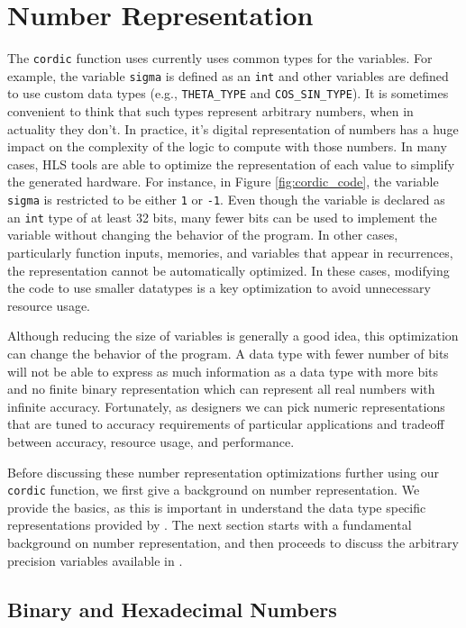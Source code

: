 \section{Number Representation}
\label{sec:number_representation}

The \lstinline{cordic} function uses currently uses common types for the variables. For example, the variable \lstinline{sigma} is defined as an \lstinline{int} and other variables are defined to use custom data types (e.g., \lstinline{THETA_TYPE} and \lstinline{COS_SIN_TYPE}).  It is sometimes convenient to think that such types represent arbitrary numbers, when in actuality they don't.  In practice, it's digital representation of numbers has a huge impact on the complexity of the logic to compute with those numbers.   In many cases, HLS tools are able to optimize the representation of each value to simplify the generated hardware.  For instance, in Figure \ref{fig:cordic_code}, the variable \lstinline{sigma} is restricted to be either \lstinline{1} or \lstinline{-1}.  Even though the variable is declared as an \lstinline{int} type of at least 32 bits, many fewer bits can be used to implement the variable without changing the behavior of the program. In other cases, particularly function inputs, memories, and variables that appear in recurrences, the representation cannot be automatically optimized.  In these cases, modifying the code to use smaller datatypes is a key optimization to avoid unnecessary resource usage.

Although reducing the size of variables is generally a good idea, this optimization can change the behavior of the program. A data type with fewer number of bits will not be able to express as much information as a data type with more bits and no finite binary representation which can represent all real numbers with infinite accuracy. Fortunately, as designers we can pick numeric representations that are tuned to accuracy requirements of particular applications and tradeoff between accuracy, resource usage, and performance.

Before discussing these number representation optimizations further using our \lstinline{cordic} function, we first give a background on number representation. We provide the basics, as this is important in understand the data type specific representations provided by \VHLS. The next section starts with a fundamental background on number representation, and then proceeds to discuss the arbitrary precision variables available in \VHLS.

\subsection{Binary and Hexadecimal Numbers}

